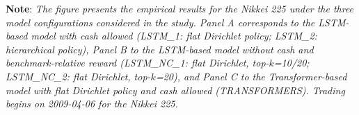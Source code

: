 \documentclass[]{elsarticle}
\begin{document}
\vspace{-0.4cm}

\linespread{0.61}\selectfont
{\noindent\scriptsize \textbf{Note}: \textit{The figure presents the empirical results for the Nikkei 225 under the three model configurations considered in the study. Panel A corresponds to the LSTM-based model with cash allowed (LSTM\_1: flat Dirichlet policy; LSTM\_2: hierarchical policy), Panel B to the LSTM-based model without cash and benchmark-relative reward (LSTM\_NC\_1: flat Dirichlet, top-$k$=10/20; LSTM\_NC\_2: flat Dirichlet, top-$k$=20), and Panel C to the Transformer-based model with flat Dirichlet policy and cash allowed (TRANSFORMERS). Trading begins on 2009-04-06 for the Nikkei 225.}}

\linespread{1.5}\selectfont

\newpage
\end{document}
